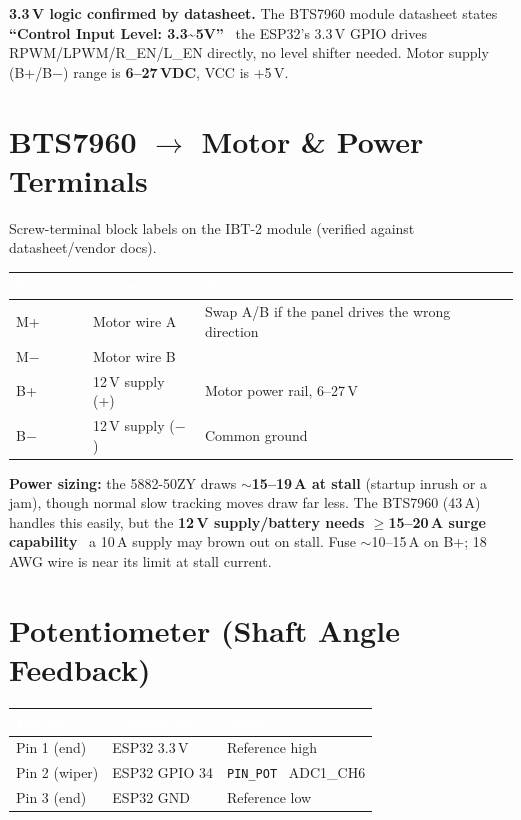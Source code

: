 \documentclass[11pt]{article}
\newcommand{\tc}[1]{\textcolor{white}{\textbf{#1}}}   %
\newcommand{\nd}{\textrm{\textemdash}}                %
\begin{document}
\begin{notebox}
\textbf{3.3\,V logic confirmed by datasheet.} The BTS7960 module datasheet states
\textbf{``Control Input Level: 3.3\textasciitilde5V''} \nd\ the ESP32's 3.3\,V GPIO
drives RPWM/LPWM/R\_EN/L\_EN directly, no level shifter needed. Motor supply
(B+/B$-$) range is \textbf{6--27\,VDC}, VCC is +5\,V.
\end{notebox}

\section*{BTS7960 $\rightarrow$ Motor \& Power Terminals}
Screw-terminal block labels on the IBT-2 module (verified against
datasheet/vendor docs).

\smallskip
{}
\begin{xltabular}{\textwidth}{@{}P{2.2cm} P{4.4cm} L@{}}
\toprule
{}\tc{Terminal} & \tc{Connection} & \tc{Notes}\\
\midrule\endhead
M+ & Motor wire A & Swap A/B if the panel drives the wrong direction\\
M$-$ & Motor wire B & \\
B+ & 12\,V supply (+) & Motor power rail, 6--27\,V\\
B$-$ & 12\,V supply ($-$) & Common ground\\
\bottomrule
\end{xltabular}

\begin{notebox}
\textbf{Power sizing:} the 5882-50ZY draws \textbf{$\sim$15--19\,A at stall}
(startup inrush or a jam), though normal slow tracking moves draw far less. The
BTS7960 (43\,A) handles this easily, but the \textbf{12\,V supply/battery needs
$\ge$15--20\,A surge capability} \nd\ a 10\,A supply may brown out on stall.
Fuse $\sim$10--15\,A on B+; 18\,AWG wire is near its limit at stall current.
\end{notebox}

\section*{Potentiometer (Shaft Angle Feedback)}
\begin{xltabular}{\textwidth}{@{}P{3cm} P{3.6cm} L@{}}
\toprule
{}\tc{Pot pin} & \tc{Connection} & \tc{Notes}\\
\midrule\endhead
Pin 1 (end) & ESP32 3.3\,V & Reference high\\
Pin 2 (wiper) & ESP32 GPIO 34 & \texttt{PIN_POT} \nd\ ADC1\_CH6\\
Pin 3 (end) & ESP32 GND & Reference low\\
\bottomrule
\end{xltabular}
\end{document}

